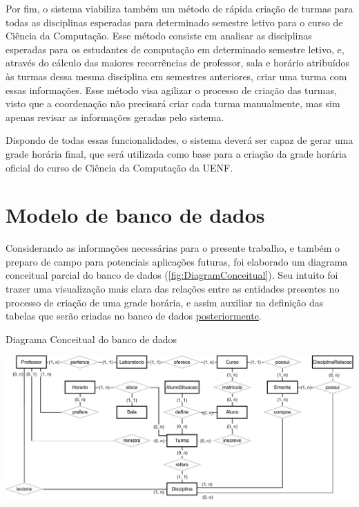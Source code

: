 Por fim, o sistema viabiliza também um método de rápida criação de turmas para todas as disciplinas esperadas para determinado semestre letivo para o curso de Ciência da Computação. Esse método consiste em analisar as disciplinas esperadas para os estudantes de computação em determinado semestre letivo, e, através do cálculo das maiores recorrências de professor, sala e horário atribuídos às turmas dessa mesma disciplina em semestres anteriores, criar uma turma com essas informações. Esse método visa agilizar o processo de criação das turmas, visto que a coordenação não precisará criar cada turma manualmente, mas sim apenas revisar as informações geradas pelo sistema.

Dispondo de todas essas funcionalidades, o sistema deverá ser capaz de gerar uma grade horária final, que será utilizada como base para a criação da grade horária oficial do curso de Ciência da Computação da UENF.

\section{Modelo de banco de dados} \label{sec:ModelagemBD} %

Considerando as informações necessárias para o presente trabalho, e também o preparo de campo para potenciais aplicações futuras, foi elaborado um diagrama conceitual parcial do banco de dados (\autoref{fig:DiagramConceitual}). Seu intuito foi trazer uma visualização mais clara das relações entre as entidades presentes no processo de criação de uma grade horária, e assim auxiliar na definição das tabelas que serão criadas no banco de dados \hyperref[ssssec:MySQL]{posteriormente}.

\begin{MyCenteredFigure} \caption{Diagrama Conceitual do banco de dados} \label{fig:DiagramConceitual}
  \includegraphics[width=\textwidth]{files/img/2.02!4-modelagem/Diagrama Conceitual}
\end{MyCenteredFigure}

